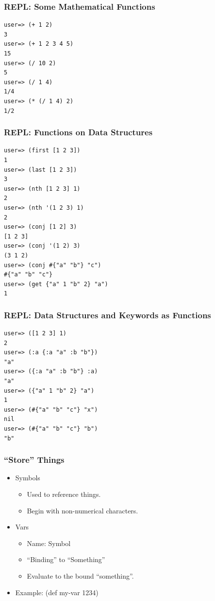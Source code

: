 \documentclass{beamer}
\begin{document}
\begin{frame}[fragile]
\frametitle{REPL: Some Mathematical Functions}
\begin{lstlisting}[basicstyle=\scriptsize]
user=> (+ 1 2)
3
user=> (+ 1 2 3 4 5)
15
user=> (/ 10 2)
5
user=> (/ 1 4)
1/4
user=> (* (/ 1 4) 2)
1/2
\end{lstlisting}
\end{frame}

\begin{frame}[fragile]
\frametitle{REPL: Functions on Data Structures}
\begin{lstlisting}[basicstyle=\scriptsize]
user=> (first [1 2 3])
1
user=> (last [1 2 3])
3
user=> (nth [1 2 3] 1)
2
user=> (nth '(1 2 3) 1)
2
user=> (conj [1 2] 3)
[1 2 3]
user=> (conj '(1 2) 3)
(3 1 2)
user=> (conj #{"a" "b"} "c")
#{"a" "b" "c"}
user=> (get {"a" 1 "b" 2} "a")
1
\end{lstlisting}
\end{frame}

\begin{frame}[fragile]
\frametitle{REPL: Data Structures and Keywords as Functions}
\begin{lstlisting}[basicstyle=\scriptsize]
user=> ([1 2 3] 1)
2
user=> (:a {:a "a" :b "b"})
"a"
user=> ({:a "a" :b "b"} :a)
"a"
user=> ({"a" 1 "b" 2} "a")
1
user=> (#{"a" "b" "c"} "x")
nil
user=> (#{"a" "b" "c"} "b")
"b"
\end{lstlisting}
\end{frame}


  \begin{frame}
      \frametitle{``Store'' Things}

      \begin{itemize}
          \item Symbols
              \begin{itemize}
                  \item Used to reference things.
                  \item Begin with non-numerical characters.
              \end{itemize}
          \item Vars
              \begin{itemize}
                  \item Name: Symbol
                  \item ``Binding'' to ``Something''
                  \item Evaluate to the bound ``something''.
              \end{itemize}
          \item Example: (def my-var 1234)
      \end{itemize}
  \end{frame}
\end{document}
